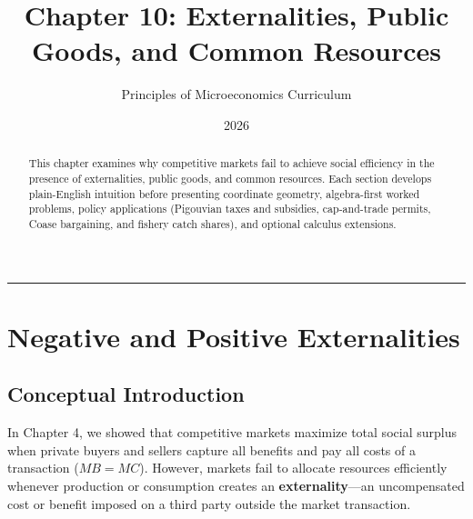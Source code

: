 \documentclass[11pt,letterpaper]{article}
\begin{document}
\title{\Huge\bfseries\color{SlateBlue} Chapter 10: Externalities, Public Goods, and Common Resources}
\author{\large Principles of Microeconomics Curriculum}
\date{2026}
\maketitle

\thispagestyle{plain}

\begin{abstract}
This chapter examines why competitive markets fail to achieve social efficiency in the presence of externalities, public goods, and common resources. Each section develops plain-English intuition before presenting coordinate geometry, algebra-first worked problems, policy applications (Pigouvian taxes and subsidies, cap-and-trade permits, Coase bargaining, and fishery catch shares), and optional calculus extensions.
\end{abstract}

\tableofcontents
\vspace{1.5em}
\hrule
\vspace{1.5em}

\section{Negative and Positive Externalities}

\subsection*{Conceptual Introduction}
In Chapter 4, we showed that competitive markets maximize total social surplus when private buyers and sellers capture all benefits and pay all costs of a transaction ($MB = MC$). However, markets fail to allocate resources efficiently whenever production or consumption creates an \textbf{externality}—an uncompensated cost or benefit imposed on a third party outside the market transaction.
\end{document}
